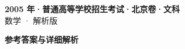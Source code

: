 \documentclass[zihao=-4, a4paper]{ctexart}
\begin{document}
\begin{center}
  {\Large\bfseries 2005 年·普通高等学校招生考试·北京卷·文科}\\[4pt]
  {\large 数学 · 解析版}
\end{center}
\medskip
{}

\clearpage
{}
\begin{center}{\Large\bfseries 参考答案与详细解析}\end{center}
\medskip

\end{document}
